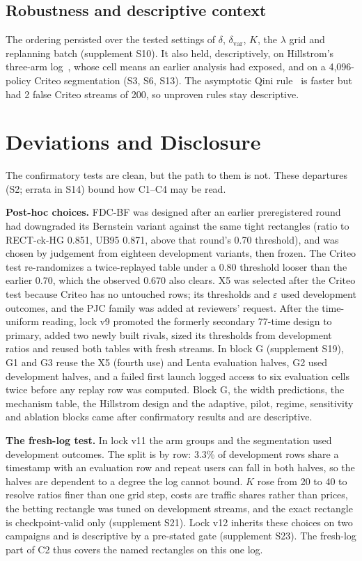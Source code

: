 \documentclass[sigconf,anonymous,review]{acmart}
\newcommand{\eps}{\varepsilon}
\newcommand{\dvar}{\delta_{\text{var}}}
\begin{document}
\subsection{Robustness and descriptive context}\label{sec:external}

The ordering persisted over the tested settings of $\delta$, $\dvar$, $K$, the $\lambda$ grid and replanning batch (supplement S10). It also held, descriptively, on Hillstrom's three-arm log~\citep{hillstrom2008minethatdata}, whose cell means an earlier analysis had exposed, and on a 4,096-policy Criteo segmentation (S3, S6, S13). The asymptotic Qini rule~\citep{sverdrup2023qini} is faster but had 2 false Criteo streams of 200, so unproven rules stay descriptive.

\section{Deviations and Disclosure}\label{sec:deviations}

The confirmatory tests are clean, but the path to them is not. These departures (S2; errata in S14) bound how C1--C4 may be read.

\textbf{Post-hoc choices.} FDC-BF was designed after an earlier preregistered round had downgraded its Bernstein variant against the same tight rectangles (ratio to RECT-ck-HG 0.851, UB95 0.871, above that round's 0.70 threshold), and was chosen by judgement from eighteen development variants, then frozen. The Criteo test re-randomizes a twice-replayed table under a 0.80 threshold looser than the earlier 0.70, which the observed 0.670 also clears. X5 was selected after the Criteo test because Criteo has no untouched rows; its thresholds and $\eps$ used development outcomes, and the PJC family was added at reviewers' request. After the time-uniform reading, lock v9 promoted the formerly secondary 77-time design to primary, added two newly built rivals, sized its thresholds from development ratios and reused both tables with fresh streams. In block G (supplement S19), G1 and G3 reuse the X5 (fourth use) and Lenta evaluation halves, G2 used development halves, and a failed first launch logged access to six evaluation cells twice before any replay row was computed. Block G, the width predictions, the mechanism table, the Hillstrom design and the adaptive, pilot, regime, sensitivity and ablation blocks came after confirmatory results and are descriptive.

\textbf{The fresh-log test.} In lock v11 the arm groups and the segmentation used development outcomes. The split is by row: 3.3\% of development rows share a timestamp with an evaluation row and repeat users can fall in both halves, so the halves are dependent to a degree the log cannot bound. $K$ rose from 20 to 40 to resolve ratios finer than one grid step, costs are traffic shares rather than prices, the betting rectangle was tuned on development streams, and the exact rectangle is checkpoint-valid only (supplement S21). Lock v12 inherits these choices on two campaigns and is descriptive by a pre-stated gate (supplement S23). The fresh-log part of C2 thus covers the named rectangles on this one log.
\end{document}
